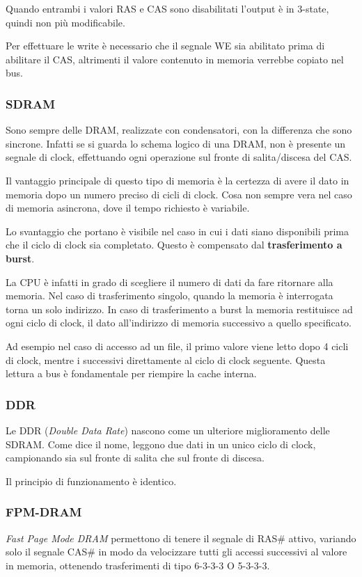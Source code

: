 \documentclass[../template]{subfiles}
\begin{document}
Quando entrambi i valori RAS e CAS sono disabilitati l'output è in 3-state, quindi non più modificabile.

Per effettuare le write è necessario che il segnale WE sia abilitato prima di abilitare il CAS, altrimenti il valore contenuto in memoria verrebbe copiato nel bus.

\subsubsection{SDRAM}
Sono sempre delle DRAM, realizzate con condensatori, con la differenza che sono sincrone.
Infatti se si guarda lo schema logico di una DRAM, non è presente un segnale di clock, effettuando ogni operazione sul fronte di salita/discesa del CAS.

Il vantaggio principale di questo tipo di memoria è la certezza di avere il dato in memoria dopo un numero preciso di cicli di clock. Cosa non sempre vera nel caso di memoria asincrona, dove il tempo richiesto è variabile.

Lo svantaggio che portano è visibile nel caso in cui i dati siano disponibili prima che il ciclo di clock sia completato.
Questo è compensato dal \textbf{trasferimento a burst}.

La CPU è infatti in grado di scegliere il numero di dati da fare ritornare alla memoria. Nel caso di trasferimento singolo, quando la memoria è interrogata torna un solo indirizzo. In caso di trasferimento a burst la memoria restituisce ad ogni ciclo di clock, il dato all'indirizzo di memoria successivo a quello specificato.

Ad esempio nel caso di accesso ad un file, il primo valore viene letto dopo 4 cicli di clock, mentre i successivi direttamente al ciclo di clock seguente.
Questa lettura a bus è fondamentale per riempire la cache interna.

\subsubsection{DDR}
Le DDR (\textit{Double Data Rate}) nascono come un ulteriore miglioramento delle SDRAM. Come dice il nome, leggono due dati in un unico ciclo di clock, campionando sia sul fronte di salita che sul fronte di discesa.

Il principio di funzionamento è identico.
\subsubsection{FPM-DRAM}
\textit{Fast Page Mode DRAM} permettono di tenere il segnale di RAS\# attivo, variando solo il segnale CAS\# in modo da velocizzare tutti gli accessi successivi al valore in memoria, ottenendo trasferimenti di tipo 6-3-3-3 O 5-3-3-3.
\end{document}

